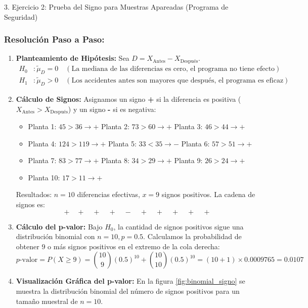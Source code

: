 \documentclass[11pt,a4paper]{article}
\begin{document}
\begin{subsection}{3. Ejercicio 2: Prueba del Signo para Muestras Apareadas (Programa de Seguridad)}
    \subsubsection*{Resolución Paso a Paso:}
    \begin{enumerate}
        \item \textbf{Planteamiento de Hipótesis:}
              Sea $D = X_{\text{Antes}} - X_{\text{Después}}$.
              \begin{align*}
                  H_0&: \tilde{\mu}_D = 0 \quad (\text{La mediana de las diferencias es cero, el programa no tiene efecto}) \\
                  H_1&: \tilde{\mu}_D > 0 \quad (\text{Los accidentes antes son mayores que después, el programa es eficaz})
              \end{align*}
        \item \textbf{Cálculo de Signos:}
              Asignamos un signo \textbf{\textbf{+}} si la diferencia es positiva ($X_{\text{Antes}} > X_{\text{Después}}$) y un signo \textbf{\textbf{-}} si es negativa:
              \begin{itemize}
                  \item Planta 1: $45 > 36 \rightarrow \mathbf{+}$ \quad Planta 2: $73 > 60 \rightarrow \mathbf{+}$ \quad Planta 3: $46 > 44 \rightarrow \mathbf{+}$
                  \item Planta 4: $124 > 119 \rightarrow \mathbf{+}$ \quad Planta 5: $33 < 35 \rightarrow \mathbf{-}$ \quad Planta 6: $57 > 51 \rightarrow \mathbf{+}$
                  \item Planta 7: $83 > 77 \rightarrow \mathbf{+}$ \quad Planta 8: $34 > 29 \rightarrow \mathbf{+}$ \quad Planta 9: $26 > 24 \rightarrow \mathbf{+}$
                  \item Planta 10: $17 > 11 \rightarrow \mathbf{+}$
              \end{itemize}
              Resultados: \textbf{$n = 10$} diferencias efectivas, \textbf{$x = 9$} signos positivos.
              La cadena de signos es:
              \[ + \quad + \quad + \quad + \quad - \quad + \quad + \quad + \quad + \quad + \]
        \item \textbf{Cálculo del p-valor:}
              Bajo $H_0$, la cantidad de signos positivos sigue una distribución binomial con $n=10, p=0.5$. Calculamos la probabilidad de obtener $9$ o más signos positivos en el extremo de la cola derecha:
              \[ p\text{-valor} = P(X \ge 9) = \binom{10}{9}(0.5)^{10} + \binom{10}{10}(0.5)^{10} = (10 + 1) \times 0.0009765 = \mathbf{0.0107} \]
        \item \textbf{Visualización Gráfica del p-valor:}
              En la figura \ref{fig:binomial_signo} se muestra la distribución binomial del número de signos positivos para un tamaño muestral de $n=10$.


\end{enumerate}
\end{subsection}
\end{document}
